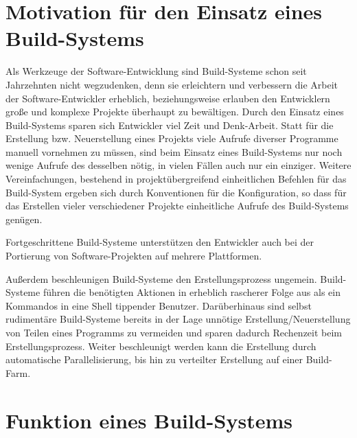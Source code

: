 \section{Motivation für den Einsatz eines Build-Systems} 

Als Werkzeuge der Software-Entwicklung sind Build-Systeme schon seit Jahrzehnten
nicht wegzudenken, denn sie erleichtern und verbessern die Arbeit der
Software-Entwickler erheblich, beziehungsweise erlauben den Entwicklern große
und komplexe Projekte überhaupt zu bewältigen. 
%
Durch den Einsatz eines Build-Systems sparen sich Entwickler viel Zeit und
Denk-Arbeit. Statt für die Erstellung bzw. Neuerstellung eines Projekts viele
Aufrufe diverser Programme manuell vornehmen zu müssen, sind beim Einsatz eines
Build-Systems nur noch wenige Aufrufe des desselben nötig, in vielen Fällen auch
nur ein einziger.
%
Weitere Vereinfachungen, bestehend in projektübergreifend einheitlichen Befehlen
für das Build-System ergeben sich durch Konventionen für die Konfiguration, so
dass für das Erstellen vieler verschiedener Projekte einheitliche Aufrufe des
Build-Systems genügen.

Fortgeschrittene Build-Systeme unterstützen den Entwickler auch bei der
Portierung von Software-Projekten auf mehrere Plattformen. %

Außerdem beschleunigen Build-Systeme den Erstellungsprozess ungemein.
Build-Systeme führen die benötigten Aktionen in erheblich rascherer Folge aus
als ein Kommandos in eine Shell tippender Benutzer. 
%
Darüberhinaus sind selbst rudimentäre Build-Systeme bereits in der Lage unnötige
Erstellung/Neuerstellung von Teilen eines Programms zu vermeiden und sparen
dadurch Rechenzeit beim Erstellungsprozess.
%
Weiter beschleunigt werden kann die Erstellung durch automatische
Parallelisierung, bis hin zu verteilter Erstellung auf einer Build-Farm.

\section{Funktion eines Build-Systems}
